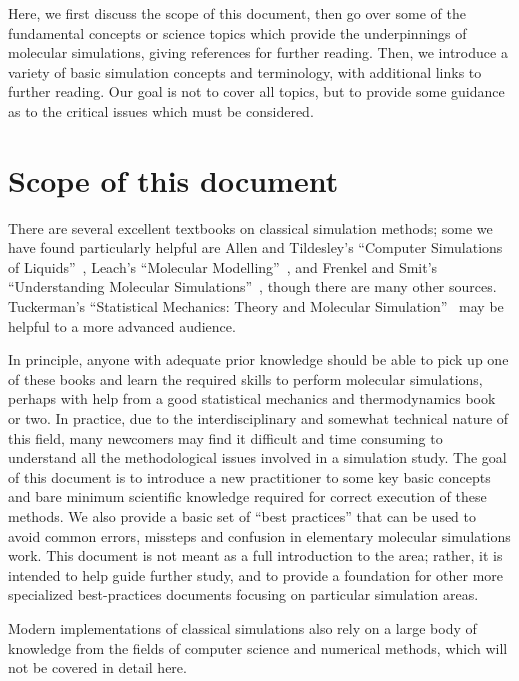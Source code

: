 \documentclass[9pt,bestpractices]{livecoms}
\begin{document}
Here, we first discuss the scope of this document, then go over some of the fundamental concepts or science topics which provide the underpinnings of molecular simulations, giving references for further reading.
Then, we introduce a variety of basic simulation concepts and terminology, with additional links to further reading.
Our goal is not to cover all topics, but to provide some guidance as to the critical issues which must be considered.

\section{Scope of this document}
\label{sec:scope}

There are several excellent textbooks on classical simulation methods; some we have found particularly helpful are Allen and Tildesley's ``Computer Simulations of Liquids''~\cite{allen_computer_2017}, Leach's ``Molecular Modelling''~\cite{LeachBook}, and Frenkel and Smit's ``Understanding Molecular Simulations''~\cite{Frenkel:2001:}, though there are many other sources.
Tuckerman's ``Statistical Mechanics: Theory and Molecular Simulation''~\cite{Tuckerman:2010:} may be helpful to a more advanced audience.

In principle, anyone with adequate prior knowledge should be able to pick up one of these books and learn the required skills to perform molecular simulations, perhaps with help from a good statistical mechanics and thermodynamics book or two.
In practice, due to the interdisciplinary and somewhat technical nature of this field, many newcomers may find it difficult and time consuming to understand all the methodological issues involved in a simulation study.  
The goal of this document is to introduce a new practitioner to some key basic concepts and bare minimum scientific knowledge required for correct execution of these methods. 
We also provide a basic set of ``best practices'' that can be used to avoid common errors, missteps and confusion in elementary molecular simulations work.
This document is not meant as a full introduction to the area; rather, it is intended to help guide further study, and to provide a foundation for other more specialized best-practices documents focusing on particular simulation areas.

Modern implementations of classical simulations also rely on a large body of knowledge from the fields of computer science and numerical methods, which will
not be covered in detail here.
\end{document}
